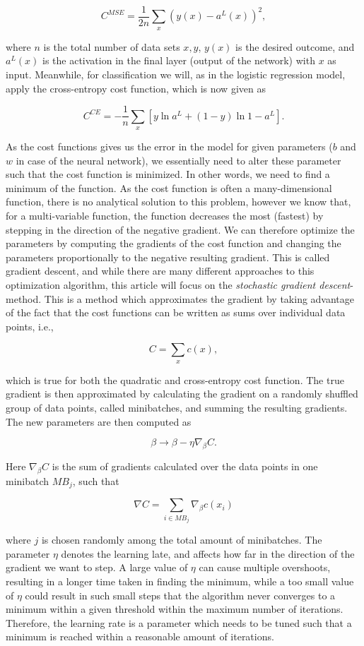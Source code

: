 \documentclass[a4paper,10pt,english]{article}
\begin{document}
$$C^{MSE} = \frac{1}{2n} \sum_x (y(x) - a^L(x))^2,$$

where $n$ is the total number of data sets $x, y$, $y(x)$ is the desired outcome, and $a^L(x)$ is the activation in the final layer (output of the network) with $x$ as input. Meanwhile, for classification we will, as in the logistic regression model, apply the cross-entropy cost function, which is now given as

$$C^{CE} = -\frac{1}{n} \sum_x \left[y \ln{a^L} + (1 - y)\ln{1 - a^L}\right].$$

As the cost functions gives us the error in the model for given parameters ($b$ and $w$ in case of the neural network), we essentially need to alter these parameter such that the cost function is minimized. In other words, we need to find a minimum of the function. As the cost function is often a many-dimensional function, there is no analytical solution to this problem, however we know that, for a multi-variable function, the function decreases the most (fastest) by stepping in the direction of the negative gradient. We can therefore optimize the parameters by computing the gradients of the cost function and changing the parameters proportionally to the negative resulting gradient. This is called gradient descent, and while there are many different approaches to this optimization algorithm, this article will focus on the \textit{stochastic gradient descent}-method. This is a method which approximates the gradient by taking advantage of the fact that the cost functions can be written as sums over individual data points, i.e.,

$$C = \sum_x c(x),$$

which is true for both the quadratic and cross-entropy cost function. The true gradient is then approximated by calculating the gradient on a randomly shuffled group of data points, called minibatches, and summing the resulting gradients. The new parameters are then computed as

$$\beta \rightarrow \beta - \eta \nabla_\beta C.$$

Here $\nabla_\beta C$ is the sum of gradients calculated over the data points in one minibatch $MB_j$, such that

$$\nabla C = \sum_{i \in MB_j} \nabla_\beta c (x_i)$$

where $j$ is chosen randomly among the total amount of minibatches. The parameter $\eta$ denotes the learning late, and affects how far in the direction of the gradient we want to step. A large value of $\eta$ can cause multiple overshoots, resulting in a longer time taken in finding the minimum, while a too small value of $\eta$ could result in such small steps that the algorithm never converges to a minimum within a given threshold within the maximum number of iterations. Therefore, the learning rate is a parameter which needs to be tuned such that a minimum is reached within a reasonable amount of iterations. 
\end{document}
